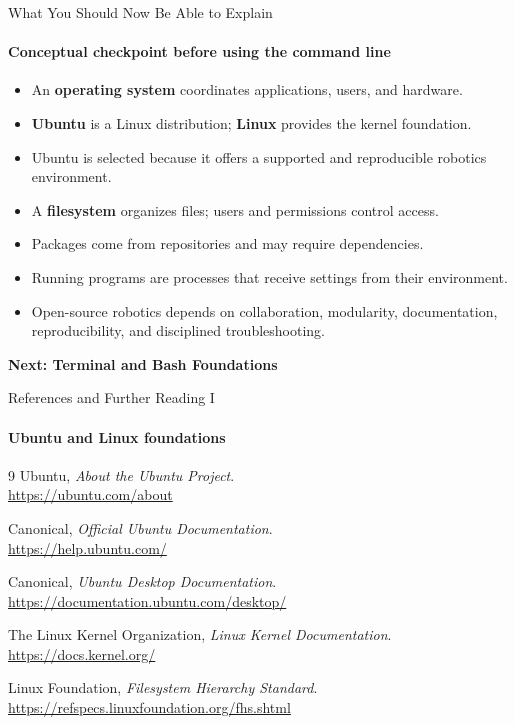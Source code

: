 \begin{frame}{What You Should Now Be Able to Explain}
\framesubtitle{Conceptual checkpoint before using the command line}

\begin{itemize}
    \item An \textbf{operating system} coordinates applications, users, and hardware.
    \item \textbf{Ubuntu} is a Linux distribution; \textbf{Linux} provides the kernel foundation.
    \item Ubuntu is selected because it offers a supported and reproducible robotics environment.
    \item A \textbf{filesystem} organizes files; users and permissions control access.
    \item Packages come from repositories and may require dependencies.
    \item Running programs are processes that receive settings from their environment.
    \item Open-source robotics depends on collaboration, modularity, documentation,
          reproducibility, and disciplined troubleshooting.
\end{itemize}

\pause

\begin{center}
    \Large
    \textbf{Next: Terminal and Bash Foundations}
\end{center}
\end{frame}





\begin{frame}{References and Further Reading I}
\framesubtitle{Ubuntu and Linux foundations}

\scriptsize
\begin{thebibliography}{9}
    Ubuntu, \emph{About the Ubuntu Project}.\\
    \url{https://ubuntu.com/about}

    Canonical, \emph{Official Ubuntu Documentation}.\\
    \url{https://help.ubuntu.com/}

    Canonical, \emph{Ubuntu Desktop Documentation}.\\
    \url{https://documentation.ubuntu.com/desktop/}

    The Linux Kernel Organization, \emph{Linux Kernel Documentation}.\\
    \url{https://docs.kernel.org/}

    Linux Foundation, \emph{Filesystem Hierarchy Standard}.\\
    \url{https://refspecs.linuxfoundation.org/fhs.shtml}
\end{thebibliography}
\end{frame}


